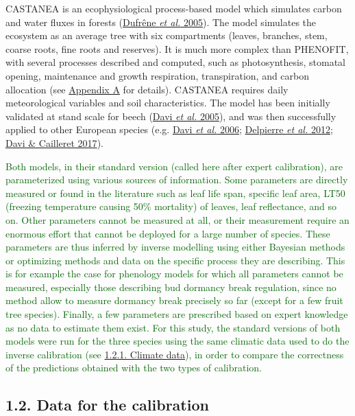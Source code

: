 \documentclass[11pt,]{article}
\begin{document}
CASTANEA is an ecophysiological process-based model which simulates
carbon and water fluxes in forests
(\protect\hyperlink{ref-Dufrene2005}{Dufrêne \emph{et al.} 2005}). The
model simulates the ecosystem as an average tree with six compartments
(leaves, branches, stem, coarse roots, fine roots and reserves). It is
much more complex than PHENOFIT, with several processes described and
computed, such as photosynthesis, stomatal opening, maintenance and
growth respiration, transpiration, and carbon allocation (see
\protect\hyperlink{appendixA}{Appendix A} for details). CASTANEA
requires daily meteorological variables and soil characteristics. The
model has been initially validated at stand scale for beech
(\protect\hyperlink{ref-Davi2005}{Davi \emph{et al.} 2005}), and was
then successfully applied to other European species (e.g.
\protect\hyperlink{ref-Davi2006}{Davi \emph{et al.} 2006};
\protect\hyperlink{ref-Delpierre2012}{Delpierre \emph{et al.} 2012};
\protect\hyperlink{ref-Davi2017}{Davi \& Cailleret 2017}).

\textcolor{darkgreen}{Both models, in their standard version (called here after expert calibration), are parameterized using various sources of information. Some parameters are directly measured or found in the literature such as leaf life span, specific leaf area, LT50 (freezing temperature causing 50\% mortality) of leaves, leaf reflectance, and so on. Other parameters cannot be measured at all, or their measurement require an enormous effort that cannot be deployed for a large number of species. These parameters are thus inferred by inverse modelling using either Bayesian methods or optimizing methods and data on the specific process they are describing. This is for example the case for phenology models for which all parameters cannot be measured, especially those describing bud dormancy break regulation, since no method allow to measure dormancy break precisely so far (except for a few fruit tree species). Finally, a few parameters are prescribed based on expert knowledge as no data to estimate them exist. For this study, the standard versions of both models were run for the three species using the same climatic data used to do the inverse calibration (see}
\protect\hyperlink{climatedata}{1.2.1. Climate
data}\textcolor{darkgreen}{), in order to compare the correctness of the predictions obtained with the two types of calibration.}

\hypertarget{data}{%
\subsection{1.2. Data for the calibration}\label{data}}
\end{document}
